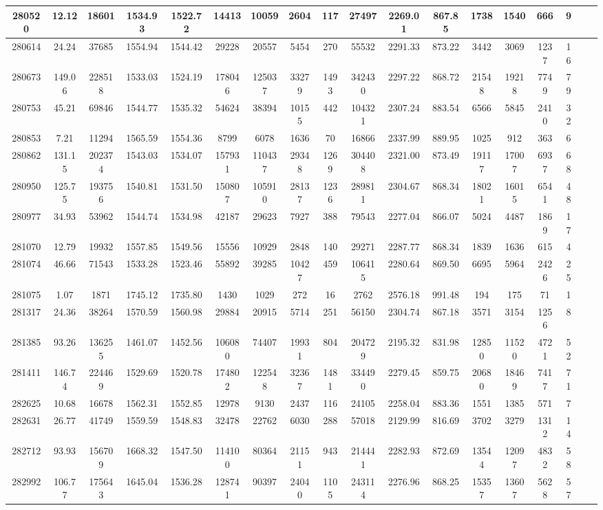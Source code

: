 \documentclass[10pt]{extarticle}
\begin{document}
\begin{longtable}{|c|c|c|c|c|c|c|c|c|c|c|c|c|c|c|c|c|c|}
\hline 
280520&12.12&18601&1534.93&1522.72&14413&10059&2604&117&27497&2269.01&867.85&1738&1540&666&9 \\ 
\hline 
280614&24.24&37685&1554.94&1544.42&29228&20557&5454&270&55532&2291.33&873.22&3442&3069&1237&16 \\ 
\hline 
280673&149.06&228518&1533.03&1524.19&178046&125037&33279&1493&342430&2297.22&868.72&21548&19218&7749&79 \\ 
\hline 
280753&45.21&69846&1544.77&1535.32&54624&38394&10155&442&104321&2307.24&883.54&6566&5845&2410&32 \\ 
\hline 
280853&7.21&11294&1565.59&1554.36&8799&6078&1636&70&16866&2337.99&889.95&1025&912&363&6 \\ 
\hline 
280862&131.15&202374&1543.03&1534.07&157931&110437&29348&1269&304408&2321.00&873.49&19117&17007&6937&68 \\ 
\hline 
280950&125.75&193756&1540.81&1531.50&150807&105910&28137&1236&289811&2304.67&868.34&18021&16015&6541&48 \\ 
\hline 
280977&34.93&53962&1544.74&1534.98&42187&29623&7927&388&79543&2277.04&866.07&5024&4487&1869&17 \\ 
\hline 
281070&12.79&19932&1557.85&1549.56&15556&10929&2848&140&29271&2287.77&868.34&1839&1636&615&4 \\ 
\hline 
281074&46.66&71543&1533.28&1523.46&55892&39285&10427&459&106415&2280.64&869.50&6695&5964&2426&25 \\ 
\hline 
281075&1.07&1871&1745.12&1735.80&1430&1029&272&16&2762&2576.18&991.48&194&175&71&1 \\ 
\hline 
281317&24.36&38264&1570.59&1560.98&29884&20915&5714&251&56150&2304.74&867.18&3571&3154&1256&8 \\ 
\hline 
281385&93.26&136255&1461.07&1452.56&106080&74407&19931&804&204729&2195.32&831.98&12850&11520&4721&52 \\ 
\hline 
281411&146.74&224469&1529.69&1520.78&174802&122548&32367&1481&334490&2279.45&859.75&20680&18469&7417&71 \\ 
\hline 
282625&10.68&16678&1562.31&1552.85&12978&9130&2437&116&24105&2258.04&883.36&1551&1385&571&7 \\ 
\hline 
282631&26.77&41749&1559.59&1548.83&32478&22762&6030&288&57018&2129.99&816.69&3702&3279&1312&14 \\ 
\hline 
282712&93.93&156709&1668.32&1547.50&114100&80364&21151&943&214441&2282.93&872.69&13544&12097&4832&58 \\ 
\hline 
282992&106.77&175643&1645.04&1536.28&128741&90397&24040&1105&243114&2276.96&868.25&15357&13607&5628&57 \\ 

\end{longtable}
\end{document}
